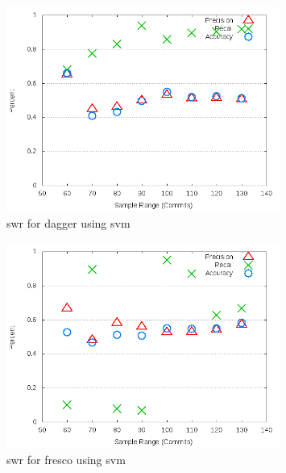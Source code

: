 \begin{figure}[!ht]
    \centering
        \includegraphics[width=0.8\textwidth]{images/svm/test_1/dagger_sample_range}
        \caption{\gls{swr} for dagger using \gls{svm}}
        \label{fig:test_1_dagger_svm}
\end{figure}



\begin{figure}[!ht]
    \centering
        \includegraphics[width=0.8\textwidth]{images/svm/test_1/fresco_sample_range}
        \caption{\gls{swr} for fresco using \gls{svm}}
        \label{fig:test_1_fresco_svm}
\end{figure}

